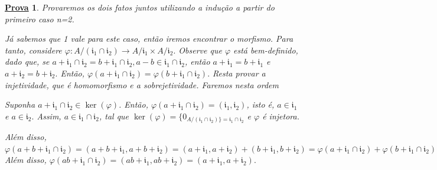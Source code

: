 \documentclass{article}
\newtheorem*{proof*}{\underline{Prova}}
\begin{document}
\begin{proof*}
  Provaremos os dois fatos juntos utilizando a indução a partir do primeiro caso n=2. 

  Já sabemos que 1 vale para este caso, então iremos encontrar o morfismo. Para tanto, considere \(\varphi :A/(\mathfrak{i}_{1}\cap \mathfrak{i}_{2})\rightarrow A/\mathfrak{i}_{1}\times A/\mathfrak{i}_{2}.\)
  Observe que \(\varphi \) está bem-definido, dado que, se \(a+\mathfrak{i}_{1}\cap \mathfrak{i}_{2} = b + \mathfrak{i}_{1}\cap \mathfrak{i}_{2}, a-b\in \mathfrak{i}_{1}\cap \mathfrak{i}_2\), 
  então \(a+\mathfrak{i}_{1} = b + \mathfrak{i}_{1}\) e \(a + \mathfrak{i}_{2} = b + \mathfrak{i}_{2}.\) Então, \(\varphi(a+\mathfrak{i}_{1}\cap \mathfrak{i}_{2}) = \varphi(b+\mathfrak{i}_{1}\cap \mathfrak{i}_{2}).\)
  Resta provar a injetividade, que é homomorfismo e a sobrejetividade. Faremos nesta ordem

  Suponha \(a+\mathfrak{i}_{1}\cap \mathfrak{i}_{2}\in\ker{(\varphi )}\). Então, \(\varphi (a + \mathfrak{i}_{1}\cap \mathfrak{i}_{2}) = (\mathfrak{i}_{1}, \mathfrak{i}_{2})\),
  isto é, \(a\in \mathfrak{i}_{1}\) e \(a\in \mathfrak{i}_{2}.\) Assim, \(a\in \mathfrak{i}_{1}\cap \mathfrak{i}_{2}\), tal que \(\ker{(\varphi )} = \{0_{A/(\mathfrak{i}_{1}\cap \mathfrak{i}_{2})\} = \mathfrak{i}_{1}\cap \mathfrak{i}_{2}}\)
  e \(\varphi \) é injetora.

  Além disso, \(\varphi (a + b + \mathfrak{i}_{1}\cap \mathfrak{i}_{2}) = (a+b+\mathfrak{i}_{1}, a + b + \mathfrak{i}_{2}) =
  (a + \mathfrak{i}_{1}, a + \mathfrak{i}_{2}) + (b+\mathfrak{i}_{1}, b + \mathfrak{i}_{2}) = \varphi(a + \mathfrak{i}_{1}\cap \mathfrak{i}_{2}) + \varphi(b + \mathfrak{i}_{1}\cap \mathfrak{i}_{2}).\)
  Além disso, \(\varphi (ab + \mathfrak{i}_{1}\cap \mathfrak{i}_{2}) = (ab + \mathfrak{i}_{1}, ab+ \mathfrak{i}_{2}) = (a+\mathfrak{i}_{1}, a+\mathfrak{i}_{2}).\)


\end{proof*}
\end{document}
